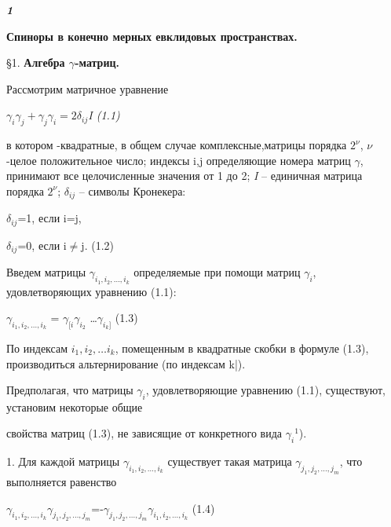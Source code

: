\documentclass{article}
\begin{document}
\flushleft
\itshape
\slshape
\parindent=0.4cm
\textbf{\chaptername \hspace{0.1cm} {1}}\par
\Large
\upshape
\textbf{Спиноры в конечно мерных евклидовых пространствах.}\par
\vspace{1.5cm}
\normalsize
\S{1.}
\hspace{0cm}
\textbf{Алгебра $\gamma$-матриц.}\par
\vspace{0.3cm}

{Рассмотрим матричное уравнение}
\begin{center}
{$\gamma_i\gamma_j + \gamma_j\gamma_i=2\delta_{ij}$\itshape{I}\upshape \hspace{2cm} (1.1)}
\end{center}
в котором -квадратные, в общем случае комплексные,матрицы порядка $2^{\nu}$, $\nu$-целое положительное число; индексы i,j определяющие номера матриц $\gamma$, принимают все целочисленные значения от 1 до 2; \textsl{I} -- единичная матрица порядка $2^{\nu}$; $\delta_{ij}$ -- символы Кронекера:\par
\begin{center}
$\delta_{ij}$=1, если i=j,\par
$\delta_{ij}$=0, если i$\ne$j.     (1.2)\par
\end{center}
{Введем матрицы $\gamma_{i_1,i_2,\dots, i_k}$ определяемые при помощи матриц $\gamma_i$, удовлетворяющих уравнению     (1.1):}\par
\begin{center}
$\gamma_{i_1,i_2,\dots, i_k}$ = $\gamma_{[i}\gamma_{i_2}$ \dots $\gamma_{{i_k}]}$   (1.3)\par
\end{center}
{По индексам $i_1,i_2,\dots i_k$, помещенным в квадратные скобки в формуле (1.3), производиться альтернирование} {(по индексам k|)}.\par
Предполагая, что матрицы $\gamma_i$, удовлетворяющие уравнению (1.1), существуют, установим некоторые общие \par свойства матриц (1.3), не зависящие от конкретного вида ${\gamma_i}^1$).\par
1. Для каждой матрицы $\gamma_{i_1,i_2,\dots, i_k}$ существует такая матрица $\gamma_{j_1,j_2,\dots, j_m}$, что выполняется равенство\par
\begin{center}
$\gamma_{i_1,i_2,\dots, i_k}$$\gamma_{j_1,j_2,\dots, j_m}$=-$\gamma_{j_1,j_2,\dots, j_m}$$\gamma_{i_1,i_2,\dots, i_k}$ (1.4)\par
\end{center}
\end{document}
